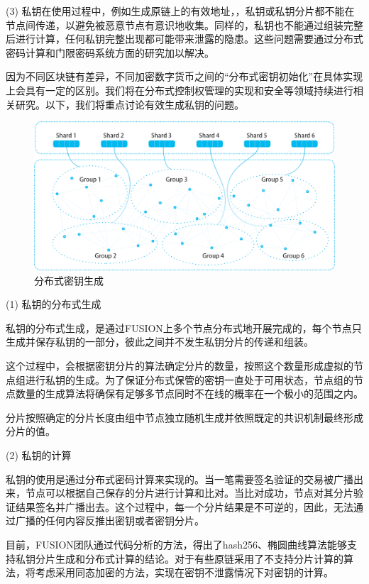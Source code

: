 \documentclass[a4paper,12pt]{article}
\begin{document}
(3) 私钥在使用过程中，例如生成原链上的有效地址，，私钥或私钥分片都不能在节点间传递，以避免被恶意节点有意识地收集。同样的，私钥也不能通过组装完整后进行计算，任何私钥完整出现都可能带来泄露的隐患。这些问题需要通过分布式密码计算和门限密码系统方面的研究加以解决。

因为不同区块链有差异，不同加密数字货币之间的“分布式密钥初始化”在具体实现上会具有一定的区别。我们将在分布式控制权管理的实现和安全等领域持续进行相关研究。以下，我们将重点讨论有效生成私钥的问题。

\begin{figure}[htbp]
\centering\includegraphics[width=5in]{pic/keygeneration.png}
\caption{分布式密钥生成}\label{fig:1}
\end{figure}

(1) 私钥的分布式生成

私钥的分布式生成，是通过FUSION上多个节点分布式地开展完成的，每个节点只生成并保存私钥的一部分，彼此之间并不发生私钥分片的传递和组装。

这个过程中，会根据密钥分片的算法确定分片的数量，按照这个数量形成虚拟的节点组进行私钥的生成。为了保证分布式保管的密钥一直处于可用状态，节点组的节点数量的生成算法将确保有足够多节点同时不在线的概率在一个极小的范围之内。

分片按照确定的分片长度由组中节点独立随机生成并依照既定的共识机制最终形成分片的值。

(2) 私钥的计算

私钥的使用是通过分布式密码计算来实现的。当一笔需要签名验证的交易被广播出来，节点可以根据自己保存的分片进行计算和比对。当比对成功，节点对其分片验证结果签名并广播出去。这个过程中，每一个分片结果是不可逆的，因此，无法通过广播的任何内容反推出密钥或者密钥分片。

目前，FUSION团队通过代码分析的方法，得出了hash256、椭圆曲线算法能够支持私钥分片生成和分布式计算的结论。对于有些原链采用了不支持分片计算的算法，将考虑采用同态加密的方法，实现在密钥不泄露情况下对密钥的计算。
\end{document}
